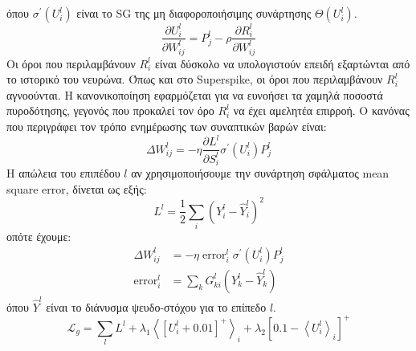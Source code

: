 \documentclass[12pt]{report}
\begin{document}
όπου $\sigma^{\prime}\left(U_{i}^{l}\right)$ είναι το \textlatin{SG} της μη διαφοροποιήσιμης συνάρτησης  $\Theta\left(U_{i}^{l}\right)$.
\begin{equation}
\frac{\partial U_{i}^{l}}{\partial W_{i j}^{l}}=P_{j}^{l}-\rho \frac{\partial R_{i}^{l}}{\partial W_{i j}^{l}}
\end{equation}
Οι όροι που περιλαμβάνουν $R_{i}^{l}$ είναι δύσκολο να υπολογιστούν επειδή εξαρτώνται από το ιστορικό του νευρώνα. Όπως και στο \textlatin{Superspike}, οι όροι που περιλαμβάνουν $R_{i}^{l}$ αγνοούνται. Η κανονικοποίηση εφαρμόζεται για να ευνοήσει τα χαμηλά ποσοστά πυροδότησης, γεγονός που προκαλεί τον όρο $R_{i}^{l}$ να έχει αμελητέα επιρροή. Ο κανόνας που περιγράφει τον τρόπο ενημέρωσης των συναπτικών βαρών είναι:
\begin{equation}
\Delta W_{i j}^{l}=-\eta \frac{\partial L^{l}}{\partial S_{i}^{l}} \sigma^{\prime}\left(U_{i}^{l}\right) P_{j}^{l}
\end{equation}
Η απώλεια του επιπέδου $l$ αν χρησιμοποιήσουμε την συνάρτηση σφάλματος \textlatin{mean square error}, δίνεται ως εξής:
\begin{equation}
L^{l}=\frac{1}{2} \sum_{i}\left(Y_{i}^{l}-\hat{Y}_{i}^{l}\right)^{2}
\end{equation}
οπότε έχουμε:
\begin{equation}
\begin{aligned}
\Delta W_{i j}^{l} &=-\eta \operatorname{error}_{i}^{l} \sigma^{\prime}\left(U_{i}^{l}\right) P_{j}^{l} \\
\operatorname{error}_{i}^{l} &=\sum_{k} G_{k i}^{l}\left(Y_{k}^{l}-\hat{Y}_{k}^{l}\right)
\end{aligned}
\end{equation}
όπου $\hat{Y}^{l}$  είναι το διάνυσμα ψευδο-στόχου για το επίπεδο $l$.
\begin{equation}
\mathcal{L}_{g}=\sum_{l} L^{l}+\lambda_{1}\left\langle\left[U_{i}^{l}+0.01\right]^{+}\right\rangle_{i}+\lambda_{2}\left[0.1-\left\langle U_{i}^{l}\right\rangle_{i}\right]^{+}
\end{equation}
\end{document}
